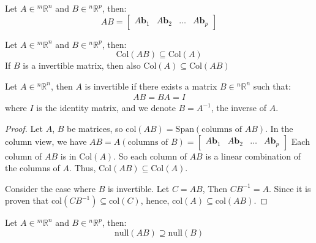 \documentclass[11pt]{article}
\begin{document}
\begin{definition}
    Let $A \in {^m\mathbb{R}^n}$ and $B \in {^n\mathbb{R}^p}$, then:
    \begin{equation}
        AB = \begin{bmatrix} A\textbf{b}_1 & A\textbf{b}_2 & \ldots & A\textbf{b}_p \end{bmatrix}
    \end{equation}
\end{definition}
\begin{theorem}
    Let $A \in {^m\mathbb{R}^n}$ and $B \in {^n\mathbb{R}^p}$, then:
    \begin{equation}
        \text{Col}(AB) \subseteq \text{Col}(A)
    \end{equation}
    If $B$ is a invertible matrix, then also $\text{Col}(A) \subseteq \text{Col}(AB)$
\end{theorem}
\begin{definition}[Invertible]
    Let $A \in {^n\mathbb{R}^n}$, then $A$ is invertible if there exists a matrix $B \in {^n\mathbb{R}^n}$ such that:
    \begin{align}
        AB = BA = I
    \end{align}
    where $I$ is the identity matrix, and we denote $B = A^{-1}$, the inverse of $A$.
\end{definition}
\begin{proof}
    Let $A$, $B$ be matrices, so $\text{col}(AB) = \text{Span}(\text{columns of }AB)$. In the column view, we have $AB = A(\text{columns of }B) = \begin{bmatrix}
        A\textbf{b}_1 & A\textbf{b}_2 & \ldots & A\textbf{b}_p
    \end{bmatrix}$
    Each column of $AB$ is in $\text{Col}(A)$. So each column of $AB$ is a linear combination of the columns of $A$. Thus, $\text{Col}(AB) \subseteq \text{Col}(A)$.

    Consider the case where $B$ is invertible. Let $C = AB$, Then $CB^{-1} = A$. Since it is proven that $\text{col}(CB^{-1}) \subseteq \text{col}(C)$, hence,  $\text{col}(A) \subseteq \text{col}(AB)$.
\end{proof}
\begin{definition}
    Let $A \in {^m\mathbb{R}^n}$ and $B \in {^n\mathbb{R}^p}$, then:
    \begin{equation}
        \text{null}(AB) \supseteq \text{null}(B)
    \end{equation}
\end{definition}
\end{document}

